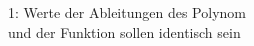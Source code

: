 \documentclass[preview]{standalone}
\begin{document}
\begin{center}
1: Werte der Ableitungen des Polynom \\ und der Funktion sollen identisch sein
\end{center}
\end{document}
